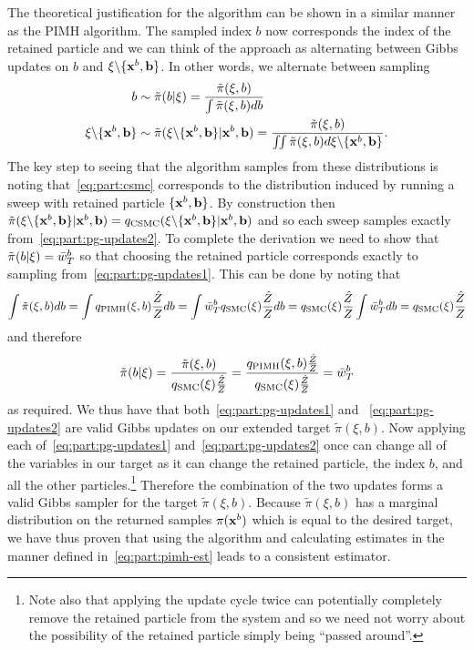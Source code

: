 The theoretical justification for the \pg algorithm can be shown in a similar manner as the PIMH algorithm.
The sampled index $b$ now corresponds the index of the retained particle and we can think of the
approach as alternating between Gibbs updates on $b$ and $\mathbf{\xi} \backslash \{\mathbf{x}^b,\mathbf{b}\}$.    In other
words, we alternate between sampling 
\begin{subequations}
	\label{eq:part:pg-updates}
	\begin{align}
	b &\sim \tilde{\pi}(b | \mathbf{\xi}) = \frac{\tilde{\pi}(\xi,b)}{\int \tilde{\pi}(\xi,b) db} \label{eq:part:pg-updates1}\\
	\mathbf{\xi} \backslash \{\mathbf{x}^b,\mathbf{b}\} & \sim \tilde{\pi}(\mathbf{\xi} \backslash \{\mathbf{x}^b,\mathbf{b}\}  | \mathbf{x}^b,\mathbf{b}) =
	\frac{\tilde{\pi}(\xi,b)}{\iint \tilde{\pi}(\xi,b) d\mathbf{\xi} \backslash \{\mathbf{x}^b,\mathbf{b}\}}. \label{eq:part:pg-updates2}
		\end{align}
\end{subequations} 
The key step to seeing that the \pg
algorithm samples from these distributions is noting that~\eqref{eq:part:csmc} corresponds to the distribution
induced by running a \csmc sweep with retained particle $\{\mathbf{x}^b,\mathbf{b}\}$.  By construction
then $\tilde{\pi}(\mathbf{\xi} \backslash \{\mathbf{x}^b,\mathbf{b}\}  | \mathbf{x}^b,\mathbf{b}) = q_{\text{CSMC}}(\mathbf{\xi} \backslash \{\mathbf{x}^b,\mathbf{b}\}  | \mathbf{x}^b,\mathbf{b})$
and so each \csmc sweep samples exactly from~\eqref{eq:part:pg-updates2}.  To complete the derivation
we need to show that $\tilde{\pi}(b | \mathbf{\xi}) = \bar{w}_T^b$ so that choosing the retained particle corresponds
exactly to sampling from~\eqref{eq:part:pg-updates1}.    This can be done by noting that
\begin{align*}
\int \tilde{\pi}(\xi,b) db = \int q_{\text{PIMH}}(\mathbf{\xi},b) \frac{\hat{Z}}{Z} db
= \int \bar{w}_T^b q_{\text{SMC}}(\mathbf{\xi}) \frac{\hat{Z}}{Z} db
= q_{\text{SMC}}(\mathbf{\xi}) \frac{\hat{Z}}{Z} \int \bar{w}_T^b  db = q_{\text{SMC}}(\mathbf{\xi}) \frac{\hat{Z}}{Z}
\end{align*}
and therefore
\begin{align*}
\tilde{\pi}(b | \mathbf{\xi}) = \frac{\tilde{\pi}(\xi,b)}{q_{\text{SMC}}(\mathbf{\xi}) \frac{\hat{Z}}{Z}} 
= \frac{q_{\text{PIMH}}(\mathbf{\xi},b) \frac{\hat{Z}}{Z}}{q_{\text{SMC}}(\mathbf{\xi}) \frac{\hat{Z}}{Z}} = \bar{w}_T^b
\end{align*}
as required.  We thus have that both~\eqref{eq:part:pg-updates1} and ~\eqref{eq:part:pg-updates2} are valid
Gibbs updates on our extended target $\tilde{\pi}(\xi,b)$.  Now applying each 
of~\eqref{eq:part:pg-updates1} and~\eqref{eq:part:pg-updates2} once can change all of the variables in
our target as it can change the retained particle, the index $b$, and all the other particles.\footnote{Note
	also that applying the update cycle twice can potentially completely remove the retained particle from the
	system and so we need not worry about the possibility of the retained particle simply being ``passed around''.}
Therefore the combination of the two updates forms a valid Gibbs sampler for the target $\tilde{\pi}(\xi,b)$.
Because $\tilde{\pi}(\xi,b)$ has a marginal distribution on the returned samples $\pi (\mathbf{x}^b)$ which is equal to
the desired target, we have thus proven that using the \pg algorithm and calculating estimates in the manner 
defined in~\eqref{eq:part:pimh-est} leads to a consistent estimator.

